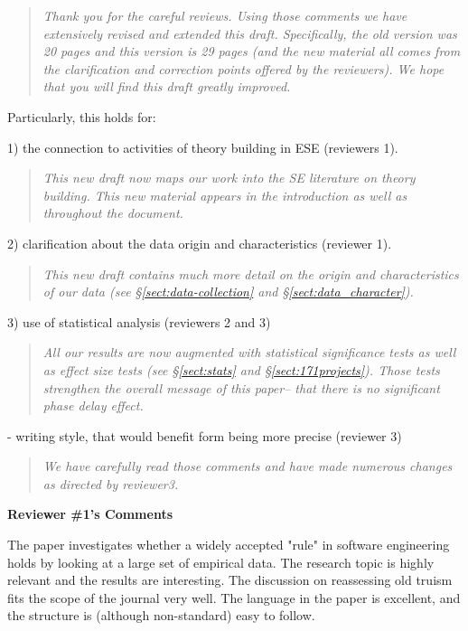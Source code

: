 \documentclass[smallcondensed]{svjour3}
\newcommand{\tion}[1]{\S\ref{sect:#1}}
\begin{document}
\begin{quote} {\em Thank you for the careful reviews. Using
those comments we have extensively revised and extended this draft.
Specifically, the old version was 20 pages and this version is 29 pages (and the new
material all comes from the clarification and correction points offered by the reviewers).
We hope that  you will find this draft greatly improved.}
\end{quote}

Particularly, this holds for:


1) the connection to activities of theory building in ESE
(reviewers 1).  


 

\begin{quote}{\em This new draft now maps our work into the SE literature on theory building. This new material appears in the introduction as well as throughout the document.}\end{quote}
 
2) clarification about the data origin and
characteristics (reviewer 1). 
 

\begin{quote}{\em
This new draft contains much more detail on the origin and characteristics of our data (see \tion{data-collection} and \tion{data_character}).}\end{quote}

3)  use of statistical analysis (reviewers 2 and 3) 

\begin{quote}{\em All our results are now augmented with statistical significance tests as well as effect size tests (see \tion{stats} and \tion{171projects}). Those tests strengthen the overall message of this paper-- that there is no significant
phase delay effect.}\end{quote}

 
- writing style, that would benefit form being more
precise (reviewer 3)

\begin{quote}{\em We have carefully read those comments and have made numerous changes
as directed by reviewer3.}\end{quote}

{\bf Reviewer \#1's Comments}


The paper investigates whether a widely
accepted "rule" in software engineering holds by looking at
a large set of empirical data. The research topic is highly
relevant and the results are interesting.   The discussion
on reassessing old truism fits the scope of the journal very
well.  The language in the paper is excellent, and the
structure is (although non-standard) easy to follow.
\end{document}
